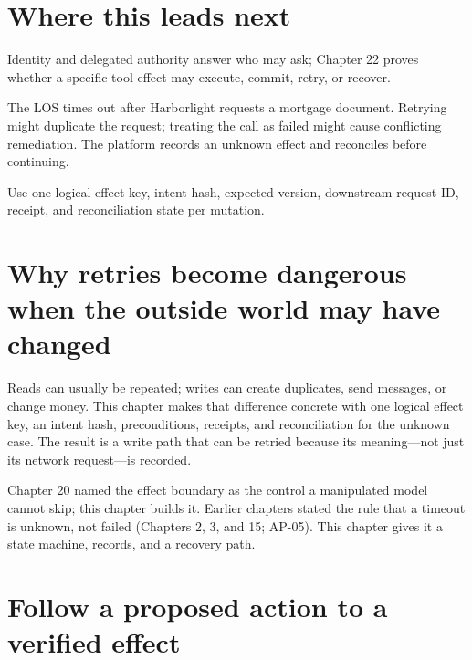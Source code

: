 \section{Where this leads next}

Identity and delegated authority answer who may ask; Chapter 22 proves whether a specific tool effect may execute, commit, retry, or recover.\par



\begin{bookcallout}
The LOS times out after Harborlight requests a mortgage document. Retrying might duplicate the request; treating the call as failed might cause conflicting remediation. The platform records an unknown effect and reconciles before continuing.
\end{bookcallout}

\begin{bookcallout}
Use one logical effect key, intent hash, expected version, downstream request ID, receipt, and reconciliation state per mutation.
\end{bookcallout}

\section{Why retries become dangerous when the outside world may have changed}

Reads can usually be repeated; writes can create duplicates, send messages, or change money. This chapter makes that difference concrete with one logical effect key, an intent hash, preconditions, receipts, and reconciliation for the unknown case. The result is a write path that can be retried because its meaning—not just its network request—is recorded.\par

Chapter 20 named the effect boundary as the control a manipulated model cannot skip; this chapter builds it. Earlier chapters stated the rule that a timeout is unknown, not failed (Chapters 2, 3, and 15; AP-05). This chapter gives it a state machine, records, and a recovery path.\par

\section{Follow a proposed action to a verified effect}


